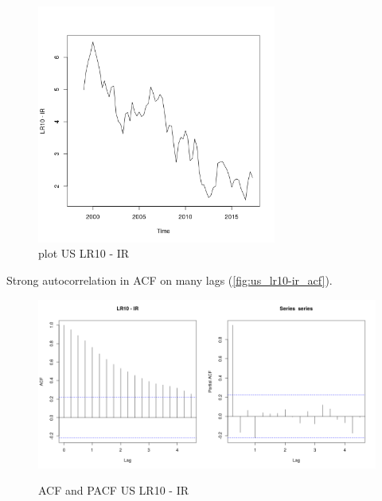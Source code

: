 \documentclass[10pt]{article}
\begin{document}
\begin{figure}[h!]
\centering
\includegraphics[width = 0.7\textwidth]{"../plots/us_LR10 - IR"}
\caption{plot US LR10 - IR}
\label{fig:us_lr10-ir}
\end{figure}

Strong autocorrelation in ACF on many lags (\autoref{fig:us_lr10-ir_acf}).

\begin{figure}[h!]
\centering
\includegraphics[width = 0.5\textwidth]{"../acf/us_LR10 - IR"}\includegraphics[width = 0.5\textwidth]{"../pacf/us_LR10 - IR"}
\caption{ACF and PACF US LR10 - IR}
\label{fig:us_lr10-ir_acf}
\end{figure}
\end{document}
